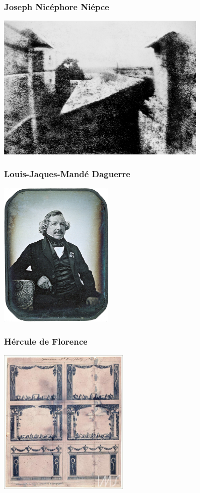 \begin{frame}
    \frametitle{Joseph Nicéphore Niépce}
\begin{center}
    \includegraphics[height=7cm]{images/niepce.jpg}
\end{center}
\end{frame}

\begin{frame}
    \frametitle{Louis-Jaques-Mandé Daguerre}
\begin{center}
    \includegraphics[height=7cm]{images/daguerre.jpg}
\end{center}
\end{frame}

\begin{frame}
    \frametitle{Hércule de Florence}
\begin{center}
    \includegraphics[height=7cm]{images/florence.jpg}
\end{center}
\end{frame}

